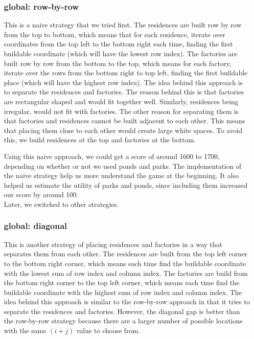 \subsubsection{global: row-by-row}
This is a naive strategy that we tried first. The residences are built row by row from the top to bottom, which means that for each residence, iterate over coordinates from the top left to the bottom right each time, finding the first buildable coordinate (which will have the lowest row index). The factories are built row by row from the bottom to the top, which means for each factory, iterate over the rows from the bottom right to top left, finding the first buildable place (which will have the highest row index). The idea behind this approach is to separate the residences and factories. The reason behind this is that factories are rectangular shaped and would fit together well. Similarly, residences being irregular, would not fit with factories. The other reason for separating them is that factories and residences cannot be built adjacent to each other. This means that placing them close to each other would create large white spaces. To avoid this, we build residences at the top and factories at the bottom.

Using this naive approach, we could get a score of around 1600 to 1700, depending on whether or not we used ponds and parks. The implementation of the naive strategy help us more understand the game at the beginning. It also helped us estimate the utility of parks and ponds, since including them increased our score by around 100.\\
Later, we switched to other strategies.
\subsubsection{global: diagonal}
This is another strategy of placing residences and factories in a way that separates them from each other. The residences are built from the top left corner to the bottom right corner, which means each time find the buildable coordinate with the lowest sum of row index and column index. The factories are build from the bottom right corner to the top left corner, which means each time find the buildable coordinate with the highest sum of row index and column index. The idea behind this approach is similar to the row-by-row approach in that it tries to separate the residences and factories. However, the diagonal gap is better than the row-by-row strategy because there are a larger number of possible locations with the same $(i+j)$ value to choose from.\\

